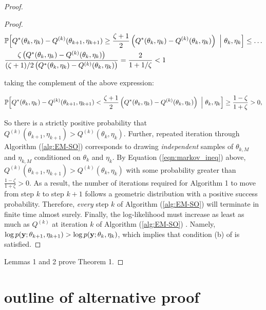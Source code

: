 \begin{proof}
\begin{proof}
\begin{align}
    & \mathbb{P} \Big[Q^*(\theta_{k},\eta_{k}) - Q^{(k)}(\theta_{k+1},\eta_{k+1}) \geq \frac{\zeta + 1}{2} \left(Q^*(\theta_{k},\eta_{k}) - Q^{(k)}(\theta_{k},\eta_{k}) \right) ~\Big\vert~ \theta_k, \eta_k \Big] \leq \ldots \\
    & \frac{\zeta \left( Q^*(\theta_{k},\eta_{k}) - Q^{(k)}(\theta_k,\eta_k) \right)}{(\zeta+1)/2 \left( Q^*(\theta_{k},\eta_{k}) - Q^{(k)}(\theta_k,\eta_k) \right)} = \frac{2}{1 + 1/\zeta} < 1
\end{align}

taking the complement of the above expression:

\begin{equation}
    \mathbb{P} \Big[Q^*(\theta_{k},\eta_{k}) - Q^{(k)}(\theta_{k+1},\eta_{k+1}) < \frac{\zeta + 1}{2} \left(Q^*(\theta_{k},\eta_{k}) - Q^{(k)}(\theta_{k},\eta_{k}) \right) ~\Big\vert~ \theta_k, \eta_k \Big] \geq \frac{1-\zeta}{1 + \zeta} > 0 \label{eqn:markov_ineq},
\end{equation}

So there is a strictly positive probability that $Q^{(k)}(\theta_{k+1},\eta_{k+1}) > Q^{(k)}(\theta_{k},\eta_{k})$. Further, repeated iteration through Algorithm (\ref{alg:EM-SO}) corresponds to drawing \textit{independent} samples of $\theta_{k,M}$ and $\eta_{k,M}$ conditioned on $\theta_k$ and $\eta_k$. By Equation (\ref{eqn:markov_ineq}) above, $Q^{(k)}(\theta_{k+1},\eta_{k+1}) > Q^{(k)}(\theta_{k},\eta_{k})$ with some probability greater than $\frac{1-\zeta}{1+\zeta} > 0$. As a result, the number of iterations required for Algorithm 1 to move from step $k$ to step $k+1$ follows a geometric distribution with a positive success probability. Therefore, \textit{every} step $k$ of Algorithm (\ref{alg:EM-SO}) will terminate in finite time almost surely. Finally, the log-likelihood must increase as least as much as $Q^{(k)}$ at iteration $k$ of Algorithm (\ref{alg:EM-SO}) \citep{Dempster:1977}. Namely, $\log p(\mathbf{y} ; \theta_{k+1},\eta_{k+1}) > \log p(\mathbf{y} ; \theta_k,\eta_k)$, which implies that condition (b) of \citet{Wu:1983} is satisfied.
\end{proof}

Lemmas 1 and 2 prove Theorem 1.

\end{proof}

\section{outline of alternative proof}

